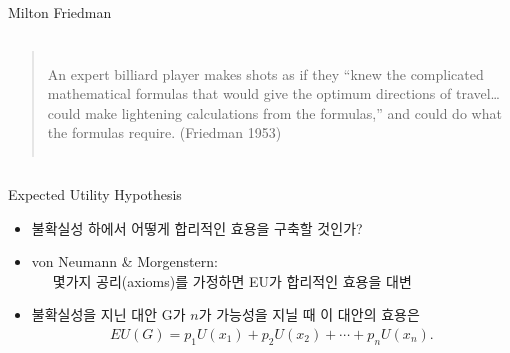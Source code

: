 \documentclass[final]{beamer}
\begin{document}
\begin{frame}[t]{Milton Friedman}
	\begin{columns}[c]
	\column{12em}
	\hspace{2em}
	\column{20em}
	\begin{quote}
	An expert billiard player makes shots as if they ``knew the complicated mathematical 
	formulas that would give the optimum directions of travel…could make 
	lightening calculations from the formulas,'' and could do what the formulas 
	require. (Friedman 1953)
	\end{quote}
	\end{columns}
\end{frame}

\begin{frame}[t]{Expected Utility Hypothesis}
	\begin{itemize}
		\item 불확실성 하에서 어떻게 합리적인 효용을 구축할 것인가?  
		\item von Neumann {\&} Morgenstern: 
		\\~~~몇가지 공리(axioms)를 가정하면 EU가 합리적인 효용을 대변
		\item 불확실성을 지닌 대안 G가 $n$가 가능성을 지닐 때 이 대안의 효용은 
		\begin{align*}
		EU(G)=p_1 U(x_1) + p_2 U(x_2) + \cdots + p_n U(x_n) . 
		\end{align*}
	\end{itemize}
\end{frame}
\end{document}
